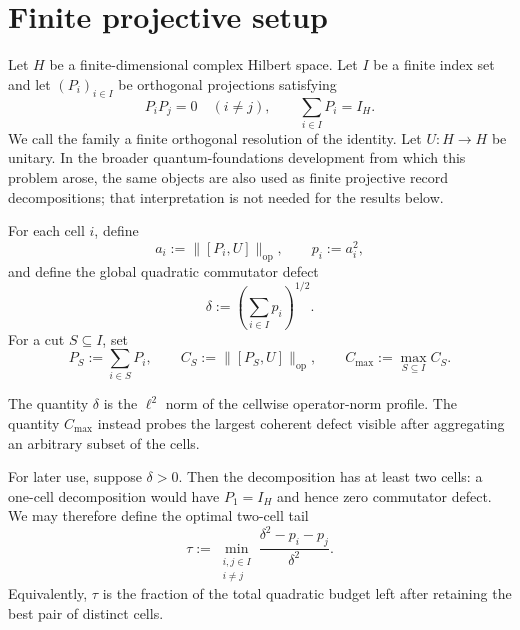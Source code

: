 \documentclass[11pt]{article}
\newcommand{\op}{\mathrm{op}}
\newcommand{\cmax}{C_{\max}}
\newcommand{\dd}{\delta}
\newcommand{\tauq}{\tau}
\begin{document}

\section{Finite projective setup}

Let $H$ be a finite-dimensional complex Hilbert space.  Let
$I$ be a finite index set and let $(P_i)_{i\in I}$ be orthogonal projections
satisfying
\begin{equation}\label{eq:decomp}
  P_iP_j=0\quad(i\neq j),
  \qquad
  \sum_{i\in I}P_i=I_H.
\end{equation}
We call the family a finite orthogonal resolution of the identity.  Let
$U:H\to H$ be unitary.  In the broader quantum-foundations development from
which this problem arose, the same objects are also used as finite projective
record decompositions; that interpretation is not needed for the results
below.

For each cell $i$, define
\begin{equation}\label{eq:ai}
  a_i:=\|[P_i,U]\|_{\op},
  \qquad
  p_i:=a_i^2,
\end{equation}
and define the global quadratic commutator defect
\begin{equation}\label{eq:delta}
  \dd:=\left(\sum_{i\in I}p_i\right)^{1/2}.
\end{equation}
For a cut $S\subseteq I$, set
\begin{equation}\label{eq:cut}
  P_S:=\sum_{i\in S}P_i,
  \qquad
  C_S:=\|[P_S,U]\|_{\op},
  \qquad
  \cmax:=\max_{S\subseteq I}C_S.
\end{equation}

The quantity $\dd$ is the $\ell^2$ norm of the cellwise operator-norm profile.
The quantity $\cmax$ instead probes the largest coherent defect visible after
aggregating an arbitrary subset of the cells.

For later use, suppose $\dd>0$.  Then the decomposition has at least two
cells: a one-cell decomposition would have $P_1=I_H$ and hence zero
commutator defect.  We may therefore define the optimal two-cell tail
\begin{equation}\label{eq:tau}
  \tauq:=
  \min_{\substack{i,j\in I\\i\neq j}}
  \frac{\dd^2-p_i-p_j}{\dd^2}.
\end{equation}
Equivalently, $\tauq$ is the fraction of the total quadratic budget left after
retaining the best pair of distinct cells.
\end{document}

